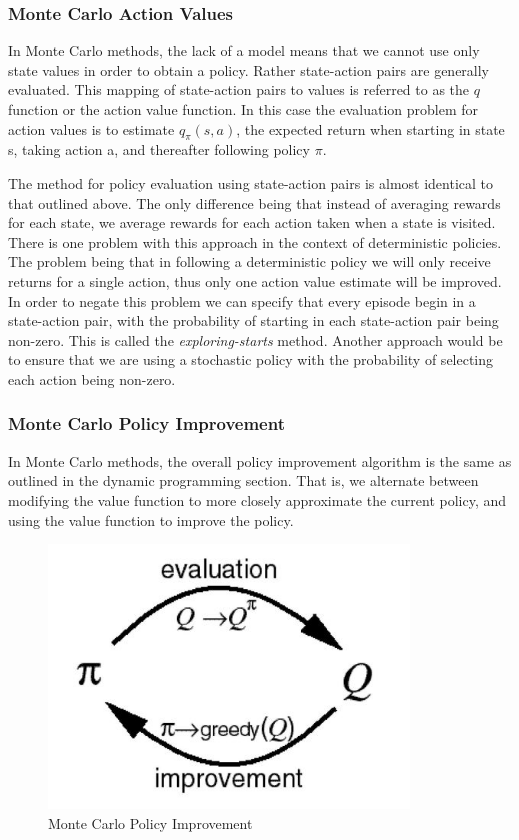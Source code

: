 \subsubsection{Monte Carlo Action Values}
In Monte Carlo methods, the lack of a model means that we cannot use only state values in order to
obtain a policy.
Rather state-action pairs are generally evaluated.
This mapping of state-action pairs to values is referred to as the $q$ function or the action value function.
In this case the evaluation problem for action values is to estimate $q_\pi(s, a)$, the expected return when
starting in state s, taking action a, and thereafter following policy $\pi$\citep{sutton1998reinforcement}.

The method for policy evaluation using state-action pairs is almost identical to that outlined above.
The only difference being that instead of averaging rewards for each state, we average
rewards for each action taken when a state is visited.
There is one problem with this approach in the context of deterministic policies.
The problem being that in following a deterministic policy we will only receive returns
for a single action, thus only one action value estimate will be improved.
In order to negate this problem we can specify that every episode begin in a state-action pair,
with the probability of starting in each state-action pair being non-zero.
This is called the \textit{exploring-starts} method.
Another approach would be to ensure that we are using a stochastic policy with
the probability of selecting each action being non-zero.

\subsubsection{Monte Carlo Policy Improvement}
In Monte Carlo methods, the overall policy improvement algorithm is the same as outlined in the dynamic
programming section.
That is, we alternate between modifying the value function to more closely approximate the current policy,
and using the value function to improve the policy.
\begin{figure}[ht]
    \includegraphics[scale=.5]{images/MC_control.png}
    \caption{Monte Carlo Policy Improvement}
\end{figure}

